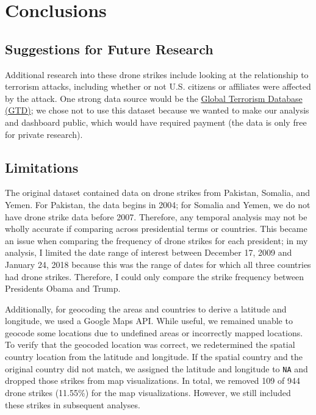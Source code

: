 \documentclass[
]{article}
\begin{document}
\hypertarget{conclusions}{%
\section{Conclusions}\label{conclusions}}

\hypertarget{suggestions-for-future-research}{%
\subsection{Suggestions for Future
Research}\label{suggestions-for-future-research}}

Additional research into these drone strikes include looking at the
relationship to terrorism attacks, including whether or not U.S.
citizens or affiliates were affected by the attack. One strong data
source would be the \href{https://start.umd.edu/gtd/}{Global Terrorism
Database (GTD)}; we chose not to use this dataset because we wanted to
make our analysis and dashboard public, which would have required
payment (the data is only free for private research).

\hypertarget{limitations}{%
\subsection{Limitations}\label{limitations}}

The original dataset contained data on drone strikes from Pakistan,
Somalia, and Yemen. For Pakistan, the data begins in 2004; for Somalia
and Yemen, we do not have drone strike data before 2007. Therefore, any
temporal analysis may not be wholly accurate if comparing across
presidential terms or countries. This became an issue when comparing the
frequency of drone strikes for each president; in my analysis, I limited
the date range of interest between December 17, 2009 and January 24,
2018 because this was the range of dates for which all three countries
had drone strikes. Therefore, I could only compare the strike frequency
between Presidents Obama and Trump.

Additionally, for geocoding the areas and countries to derive a latitude
and longitude, we used a Google Maps API. While useful, we remained
unable to geocode some locations due to undefined areas or incorrectly
mapped locations. To verify that the geocoded location was correct, we
redetermined the spatial country location from the latitude and
longitude. If the spatial country and the original country did not
match, we assigned the latitude and longitude to \texttt{NA} and dropped
those strikes from map visualizations. In total, we removed 109 of 944
drone strikes (11.55\%) for the map visualizations. However, we still
included these strikes in subsequent analyses.
\end{document}
